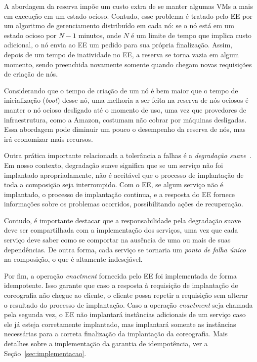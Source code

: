 \begin{description}
A abordagem da reserva impõe um custo extra de se manter algumas VMs a mais
em execução em um estado ocioso. Contudo, esse problema é tratado
pelo EE por um algoritmo de gerenciamento distribuído em cada nó:
se o nó está em um estado ocioso por $N-1$ minutos, onde $N$ é um limite
de tempo que implica custo adicional, o nó envia ao EE um pedido para 
sua própria finalização. Assim, depois de um tempo de inatividade no EE,
a reserva se torna vazia em algum momento, sendo preenchida novamente
somente quando chegam novas requisições de criação de nós.

Considerando que o tempo de criação de um nó é bem maior que o tempo de inicialização (\emph{boot})
desse nó, uma melhoria a ser feita na reserva de nós ociosos é manter o nó ocioso desligado
até o momento de uso, uma vez que provedores de infraestrutura, como a Amazon,
costumam não cobrar por máquinas desligadas.
Essa abordagem pode diminuir um pouco o desempenho da reserva de nós,
mas irá economizar mais recursos.

Outra prática importante relacionada a tolerância a falhas é a 
\emph{degradação suave}~\cite{Brewer2001GiantScale,Hamilton2007InternetScale}.
Em nosso contexto, degradação suave significa que se um serviço não foi 
implantado apropriadamente, não é aceitável que o processo de implantação
de toda a composição seja interrompido.
Com o EE, se algum serviço não é implantado, o processo de implantação continua,
e a resposta do EE fornece informações sobre os problemas ocorridos,
possibilitando ações de recuperação.

Contudo, é importante destacar que a responsabilidade pela degradação suave
deve ser compartilhada com a implementação dos serviços, uma vez que cada serviço
deve saber como se comportar na ausência de uma ou mais de suas dependências.
De outra forma, cada serviço se tornaria um \emph{ponto de falha único} na composição,
o que é altamente indesejável.

Por fim, a operação \emph{enactment} fornecida pelo EE foi implementada de forma idempotente. 
Isso garante que caso a resposta à requisição 
de implantação de coreografia não chegue ao cliente, o cliente possa repetir a requisição
sem alterar o resultado do processo de implantação. 
Caso a operação \emph{enactment} seja chamada pela segunda vez, o EE não implantará
instâncias adicionais de um serviço caso ele já esteja corretamente implantado, mas 
implantará somente as instâncias necessárias para a correta finalização da implantação 
da coreografia. Mais detalhes sobre a implementação da garantia de idempotência, ver a Seção~\ref{sec:implementacao}.


\end{description}
